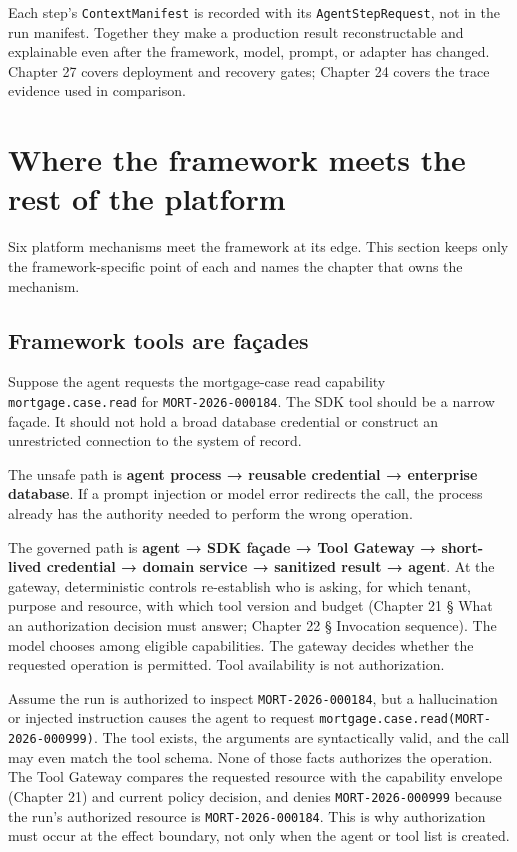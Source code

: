 Each step's \lstinline[style=bookinline]!ContextManifest! is recorded with its \lstinline[style=bookinline]!AgentStepRequest!, not in the run manifest. Together they make a production result reconstructable and explainable even after the framework, model, prompt, or adapter has changed. Chapter 27 covers deployment and recovery gates; Chapter 24 covers the trace evidence used in comparison.\par

\section{Where the framework meets the rest of the platform}

Six platform mechanisms meet the framework at its edge. This section keeps only the framework-specific point of each and names the chapter that owns the mechanism.\par

\subsection{Framework tools are façades}

Suppose the agent requests the mortgage-case read capability \lstinline[style=bookinline]!mortgage.case.read! for \lstinline[style=bookinline]!MORT-2026-000184!. The SDK tool should be a narrow façade. It should not hold a broad database credential or construct an unrestricted connection to the system of record.\par

The unsafe path is \textbf{agent process → reusable credential → enterprise database}. If a prompt injection or model error redirects the call, the process already has the authority needed to perform the wrong operation.\par

The governed path is \textbf{agent → SDK façade → Tool Gateway → short-lived credential → domain service → sanitized result → agent}. At the gateway, deterministic controls re-establish who is asking, for which tenant, purpose and resource, with which tool version and budget (Chapter 21 § What an authorization decision must answer; Chapter 22 § Invocation sequence). The model chooses among eligible capabilities. The gateway decides whether the requested operation is permitted. Tool availability is not authorization.\par

Assume the run is authorized to inspect \lstinline[style=bookinline]!MORT-2026-000184!, but a hallucination or injected instruction causes the agent to request \lstinline[style=bookinline]!mortgage.case.read(MORT-2026-000999)!. The tool exists, the arguments are syntactically valid, and the call may even match the tool schema. None of those facts authorizes the operation. The Tool Gateway compares the requested resource with the capability envelope (Chapter 21) and current policy decision, and denies \lstinline[style=bookinline]!MORT-2026-000999! because the run’s authorized resource is \lstinline[style=bookinline]!MORT-2026-000184!. This is why authorization must occur at the effect boundary, not only when the agent or tool list is created.\par

